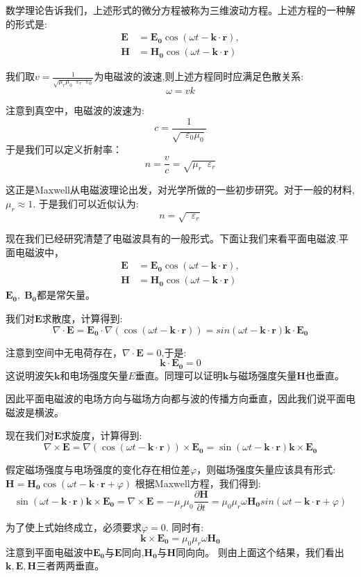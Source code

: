 \documentclass[12pt,a4paper,oneside]{report}
\theoremstyle{definition}
\theoremstyle{remark}
\newcommand{\mb}[1]{\mathbf{#1}}
\renewcommand{\v}{\mathop{}\!\varepsilon}
\begin{document}
数学理论告诉我们，上述形式的微分方程被称为三维波动方程。上述方程的一种解的形式是:
\begin{align*}
\mb{E} &= \mb{E_0} \cos(\omega t - \mathbf k \cdot \mathbf r), \\[4pt]
\mb{H} &= \mb{H_0} \cos(\omega t - \mathbf k \cdot \mathbf r)
\end{align*}


我们取$v=\frac{1}{\sqrt{\mu_r\mu_0\v_r\v_0}}$为电磁波的波速,则上述方程同时应满足色散关系:
\[
\omega = vk
\]

注意到真空中，电磁波的波速为:
\[
c= \frac{1}{\sqrt{\v_0\mu_0}}
\]
于是我们可以定义折射率：
\[
n = \frac{v}{c} = \sqrt{\mu_r\v_r}
\]

这正是Maxwell从电磁波理论出发，对光学所做的一些初步研究。对于一般的材料,$\mu_r\approx 1$. 于是我们可以近似认为:
\[
n = \sqrt{\v_r}
\]

现在我们已经研究清楚了电磁波具有的一般形式。下面让我们来看平面电磁波.平面电磁波中，
\begin{align*}
\mb{E} &= \mb{E_0} \cos(\omega t - \mathbf k \cdot \mathbf r), \\[4pt]
\mb{H} &= \mb{H_0} \cos(\omega t - \mathbf k \cdot \mathbf r)
\end{align*}
$\mb{E_0},\; \mb{B_0}$都是常矢量。

我们对$\mb{E}$求散度，计算得到:
\[
\nabla \cdot \mb{E} = \mb{E_0} \cdot \nabla(\cos(\omega t -\mb{k}\cdot \mb{r})) = sin(\omega t- \mb{k}\cdot \mb{r})\mb{k}\cdot \mb{E_0}
\]

注意到空间中无电荷存在，$\nabla \cdot \mb{E}=0$,于是:
\[
\mb{k}\cdot \mb{E_0} = 0
\]
这说明波矢$\mb{k}$和电场强度矢量$E$垂直。同理可以证明$\mb{k}$与磁场强度矢量$\mb{H}$也垂直。

因此平面电磁波的电场方向与磁场方向都与波的传播方向垂直，因此我们说平面电磁波是横波。

现在我们对$\mb{E}$求旋度，计算得到:
\[
\nabla\times\mb{E} =  \nabla(\cos(\omega t -\mb{k}\cdot \mb{r}))\times \mb{E_0} = \sin(\omega t- \mb{k}\cdot \mb{r})\mb{k}\times \mb{E_0}
\]

假定磁场强度与电场强度的变化存在相位差$\varphi$，则磁场强度矢量应该具有形式:$\mb{H} = \mb{H_0} \cos(\omega t - \mathbf k \cdot \mathbf r+\varphi)$ 根据Maxwell方程，我们得到:
\[
\sin(\omega t- \mb{k}\cdot \mb{r})\mb{k}\times \mb{E_0}= \nabla \times \mb{E} = -\mu_r\mu_0\frac{\partial\mathbf{H}}{\partial t} = \mu_0 \mu_r \omega \mb{H_0}sin(\omega t- \mb{k}\cdot \mb{r}+\varphi)
\]

为了使上式始终成立，必须要求$\varphi = 0$. 同时有:
\[
\mb{k} \times \mb{E_0} = \mu_0\mu_r \omega \mb{H_0} 
\]
注意到平面电磁波中$\mb{E_0}$与$\mb{E}$同向,$\mb{H_0}$与$\mb{H}$同向向。
则由上面这个结果，我们看出$\mb{k},\mb{E},\mb{H}$三者两两垂直。
\end{document}

